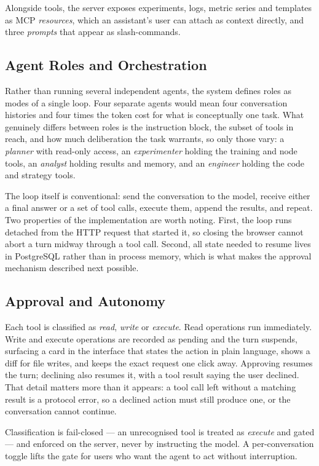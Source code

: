 \documentclass[conference]{IEEEtran}
\begin{document}
Alongside tools, the server exposes experiments, logs, metric series and
templates as MCP \emph{resources}, which an assistant's user can attach
as context directly, and three \emph{prompts} that appear as
slash-commands.

\subsection{Agent Roles and Orchestration}

Rather than running several independent agents, the system defines roles
as modes of a single loop.
Four separate agents would mean four conversation histories and four
times the token cost for what is conceptually one task.
What genuinely differs between roles is the instruction block, the subset
of tools in reach, and how much deliberation the task warrants, so only
those vary: a \emph{planner} with read-only access, an
\emph{experimenter} holding the training and node tools, an
\emph{analyst} holding results and memory, and an \emph{engineer} holding
the code and strategy tools.

The loop itself is conventional: send the conversation to the model,
receive either a final answer or a set of tool calls, execute them,
append the results, and repeat.
Two properties of the implementation are worth noting.
First, the loop runs detached from the HTTP request that started it, so
closing the browser cannot abort a turn midway through a tool call.
Second, all state needed to resume lives in PostgreSQL rather than in
process memory, which is what makes the approval mechanism described
next possible.

\subsection{Approval and Autonomy}

Each tool is classified as \emph{read}, \emph{write} or \emph{execute}.
Read operations run immediately.
Write and execute operations are recorded as pending and the turn
suspends, surfacing a card in the interface that states the action in
plain language, shows a diff for file writes, and keeps the exact
request one click away.
Approving resumes the turn; declining also resumes it, with a tool
result saying the user declined.
That detail matters more than it appears: a tool call left without a
matching result is a protocol error, so a declined action must still
produce one, or the conversation cannot continue.

Classification is fail-closed --- an unrecognised tool is treated as
\emph{execute} and gated --- and enforced on the server, never by
instructing the model.
A per-conversation toggle lifts the gate for users who want the agent to
act without interruption.
\end{document}
